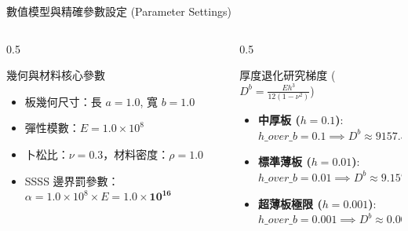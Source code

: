 \begin{frame}{數值模型與精確參數設定 (Parameter Settings)}
    \begin{columns}
        \begin{column}{0.5\textwidth}
            \begin{block}{幾何與材料核心參數}
                \begin{itemize}
                    \item 板幾何尺寸：長 $a = 1.0$, 寬 $b = 1.0$
                    \item 彈性模數：$E = 1.0 \times 10^8$
                    \item 卜松比：$\nu = 0.3$，材料密度：$\rho = 1.0$
                    \item SSSS 邊界罰參數：$\alpha = 1.0 \times 10^8 \times E = \mathbf{1.0 \times 10^{16}}$
                \end{itemize}
            \end{block}
        \end{column}
        
        \begin{column}{0.5\textwidth}
            \begin{block}{厚度退化研究梯度 ($D^b = \frac{Eh^3}{12(1-\nu^2)}$)}
                \begin{itemize}
                    \item \textbf{中厚板 ($h = 0.1$)}:\\
                          $h\_over\_b = 0.1 \implies D^b \approx 9157.5$
                    \item \textbf{標準薄板 ($h = 0.01$)}:\\
                          $h\_over\_b = 0.01 \implies D^b \approx 9.1575$
                    \item \textbf{超薄板極限 ($h = 0.001$)}:\\
                          $h\_over\_b = 0.001 \implies D^b \approx 0.0091575$
                \end{itemize}
            \end{block}
        \end{column}
    \end{columns}
\end{frame}